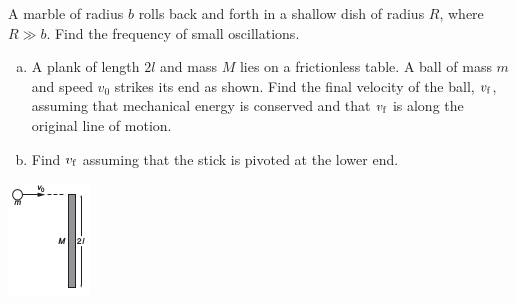 \documentclass[12pt,letterpaper]{hmcpset}
\begin{document}
\begin{problem}
A marble of radius $b$ rolls back and forth in a shallow dish of radius $R$,
where $R \gg b$. Find the frequency of small oscillations.
\end{problem}
\clearpage


\begin{problem}
\begin{enumerate}[(a)]
\item A plank of length $2l$ and mass $M$ lies on a frictionless table. A
ball of mass $m$ and speed $v_{0}$ strikes its end as shown. Find the final
velocity of the ball, $v_{\rm f}$, assuming that mechanical energy is
conserved and that $v_{\rm f}$ is along the original line of motion.
\item Find $v_{\rm f}$ assuming that the stick is pivoted at the lower end.
\end{enumerate}
\begin{center}
    \includegraphics{img/7_37}
\end{center}
\end{problem}
\end{document}
